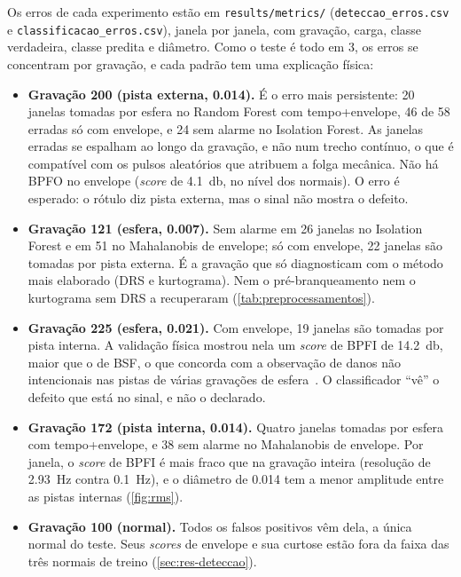 Os erros de cada experimento estão em \texttt{results/metrics/}
(\texttt{deteccao\_erros.csv} e \texttt{classificacao\_erros.csv}), janela por
janela, com gravação, carga, classe verdadeira, classe predita e diâmetro. Como
o teste é todo em \SI{3}{\hp}, os erros se concentram por gravação, e cada
padrão tem uma explicação física:
\begin{itemize}
  \item \textbf{Gravação 200 (pista externa, \SI{0.014}{\inch}).} É o erro mais
  persistente: 20 janelas tomadas por esfera no Random Forest com tempo+envelope,
  46 de 58 erradas só com envelope, e 24 sem alarme no Isolation Forest. As
  janelas erradas se espalham ao longo da gravação, e não num trecho contínuo, o
  que é compatível com os pulsos aleatórios que \textcite[p.~110]{smith2015}
  atribuem a folga mecânica. Não há BPFO no envelope (\emph{score} de
  \SI{4.1}{\decibel}, no nível dos normais). O erro é esperado: o rótulo diz pista
  externa, mas o sinal não mostra o defeito.
  \item \textbf{Gravação 121 (esfera, \SI{0.007}{\inch}).} Sem alarme em 26
  janelas no Isolation Forest e em 51 no Mahalanobis de envelope; só com envelope,
  22 janelas são tomadas por pista externa. É a gravação que
  \textcite{smith2015} só diagnosticam com o método mais elaborado (DRS e
  kurtograma). Nem o pré-branqueamento nem o kurtograma sem DRS a recuperaram
  (\autoref{tab:preprocessamentos}).
  \item \textbf{Gravação 225 (esfera, \SI{0.021}{\inch}).} Com envelope, 19
  janelas são tomadas por pista interna. A validação física mostrou nela um
  \emph{score} de BPFI de \SI{14.2}{\decibel}, maior que o de BSF, o que concorda com a
  observação de danos não intencionais nas pistas de várias gravações de
  esfera~\cite[p.~109--110]{smith2015}. O classificador ``vê'' o defeito que
  está no sinal, e não o declarado.
  \item \textbf{Gravação 172 (pista interna, \SI{0.014}{\inch}).} Quatro janelas
  tomadas por esfera com tempo+envelope, e 38 sem alarme no Mahalanobis de
  envelope. Por janela, o \emph{score} de BPFI é mais fraco que na gravação inteira
  (resolução de \SI{2.93}{\hertz} contra \SI{0.1}{\hertz}), e o diâmetro de
  \SI{0.014}{\inch} tem a menor amplitude entre as pistas internas
  (\autoref{fig:rms}).
  \item \textbf{Gravação 100 (normal).} Todos os falsos positivos vêm dela, a
  única normal do teste. Seus \emph{scores} de envelope e sua curtose estão fora da
  faixa das três normais de treino (\autoref{sec:res-deteccao}).
\end{itemize}

